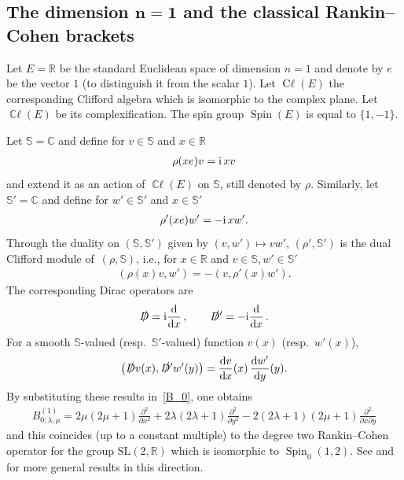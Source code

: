 \documentclass[10pt,a4paper]{amsart}
\DeclareMathOperator{\cl}{C\ell} %
\DeclareMathOperator{\ccl}{\mathbb{C}\ell} %
\DeclareMathOperator{\Spin}{Spin}
\newcommand{\fsl}[1]{{\slashed{#1}}} %
\numberwithin{equation}{section}
\begin{document}
\subsection[The dimension n=1 and the classical Rankin--Cohen brackets]
{The dimension $\boldsymbol{n=1}$ and the classical Rankin--Cohen brackets}

Let $E=\mathbb R$ be the standard Euclidean space of dimension $n=1$ and denote by $e$ be the vector $1$ (to distinguish it from the scalar $1$). Let $\cl(E)$ the corresponding Clifford algebra which is isomorphic to the complex plane. Let $\ccl{(E)}$ be its complexification. The spin group $\Spin(E)$ is equal to $\{1,-1\}$.

Let $\mathbb S = \mathbb C$ and define for $v\in \mathbb S$ and $x\in \mathbb R$
\begin{gather*}
\rho(xe) v = {\rm i}\,xv
\end{gather*}
and extend it as an action of $\ccl(E)$ on $\mathbb S$, still denoted by $\rho$.
Similarly, let $\mathbb S'=\mathbb C$ and define for $w'\in \mathbb S'$ and $x \in \mathbb S'$
\begin{gather*}
\rho'(xe) w' = -{\rm i}\, xw'.
\end{gather*}
Through the duality on $(\mathbb S, \mathbb S') $ given by $(v,w')\mapsto vw'$, $(\rho',\mathbb S')$ is the dual Clifford module of~$(\rho, \mathbb S)$, i.e., for $x\in \mathbb R$ and $v\in \mathbb S, w'\in \mathbb S'$
\begin{gather*}
(\rho(x)v,w') = -(v,\rho'(x)w').
\end{gather*}
The corresponding Dirac operators are
\begin{gather*}
\fsl{D} = {\rm i} \frac{{\rm d}}{{\rm d} x}\,,\qquad
\fsl{D'} = -{\rm i} \frac{{\rm d}}{{\rm d} x}\, .
\end{gather*}
For a smooth $\mathbb S$-valued (resp.~$\mathbb S'$-valued) function $v(x)$ (resp.~$w'(x)$),
\begin{gather*}
\big(\fsl{D} v(x), \fsl{D'} w'(y)\big)= \frac{{\rm d}v}{{\rm d}x} (x)\,\frac{{\rm d}w'}{{\rm d}y}(y).
\end{gather*}
By substituting these results in~\eqref{B_0}, one obtains
\begin{gather}\label{B_0dim1}
B_{0;\lambda, \mu}^{(1)} = 2\mu(2\mu+1)\frac{\partial^2}{\partial x^2}+2\lambda(2\lambda+1) \frac{\partial^2}{\partial y^2}-2(2\lambda+1)(2\mu+1) \frac{\partial^2}{\partial x\partial y}
\end{gather}
and this coincides (up to a constant multiple) to the degree two Rankin--Cohen operator for the group $\mathrm{SL}(2,\mathbb R)$ which is isomorphic to $\Spin_0(1,2)$. See \cite[Theorem~10.7]{bck1} and~\cite{kp16} for more general results in this direction.
\end{document}

